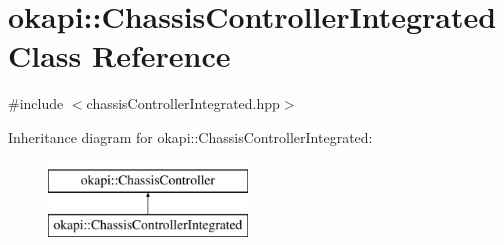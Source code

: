 \hypertarget{classokapi_1_1ChassisControllerIntegrated}{}\section{okapi\+::Chassis\+Controller\+Integrated Class Reference}
\label{classokapi_1_1ChassisControllerIntegrated}


{\ttfamily \#include $<$chassis\+Controller\+Integrated.\+hpp$>$}

Inheritance diagram for okapi\+::Chassis\+Controller\+Integrated\+:\begin{figure}[H]
\begin{center}
\leavevmode
\includegraphics[height=2.000000cm]{classokapi_1_1ChassisControllerIntegrated}
\end{center}
\end{figure}
